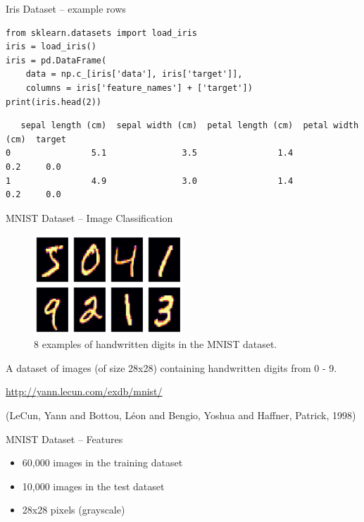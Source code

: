 \documentclass[10pt]{beamer}
\begin{document}
\begin{frame}[label={sec:orge0118b0},fragile]{Iris Dataset -- example rows}
 \begin{verbatim}
from sklearn.datasets import load_iris
iris = load_iris()
iris = pd.DataFrame(
    data = np.c_[iris['data'], iris['target']],
    columns = iris['feature_names'] + ['target'])
print(iris.head(2))
\end{verbatim}

\begin{verbatim}
   sepal length (cm)  sepal width (cm)  petal length (cm)  petal width (cm)  target
0                5.1               3.5                1.4               0.2     0.0
1                4.9               3.0                1.4               0.2     0.0
\end{verbatim}
\end{frame}

\begin{frame}[label={sec:org46dd72b}]{MNIST Dataset -- Image Classification}
\begin{figure}[htbp]
\centering
\includegraphics[width=0.5\textwidth]{images/mnist.png}
\caption{8 examples of handwritten digits in the MNIST dataset.}
\end{figure}

A dataset of images (of size 28x28) containing handwritten digits from 0 - 9.

\url{http://yann.lecun.com/exdb/mnist/}

(LeCun, Yann and Bottou, L{\'e}on and Bengio, Yoshua and Haffner, Patrick, 1998)
\end{frame}

\begin{frame}[label={sec:org20d38b9}]{MNIST Dataset -- Features}
\begin{itemize}
\item 60,000 images in the training dataset
\item 10,000 images in the test dataset
\item 28x28 pixels (grayscale)
\end{itemize}
\end{frame}
\end{document}

